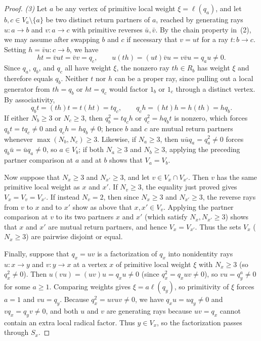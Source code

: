 \begin{proof}
\textit{(3)} Let $a$ be any vertex of primitive local weight $\xi=\ell(q_a)$, and let $b,c\in V_a\setminus\{a\}$ be two distinct return partners of $a$, reached by generating rays $u\colon a\to b$ and $v\colon a\to c$ with primitive reverses $\bar u,\bar v$. By the chain property in~(2), we may assume after swapping $b$ and $c$ if necessary that $v=ut$ for a ray $t\colon b\to c$. Setting $h=\bar v u\colon c\to b$, we have
\[
  ht=\bar v ut=\bar v v=q_c,\qquad u(th)=(ut)\bar v u=v\bar v u=q_a u\ne0.
\]
Since $q_a$, $q_b$, and $q_c$ all have weight $\xi$, the nonzero ray $th\in R_b$ has weight $\xi$ and therefore equals $q_b$. Neither $t$ nor $h$ can be a proper ray, since pulling out a local generator from $th=q_b$ or $ht=q_c$ would factor $1_b$ or $1_c$ through a distinct vertex. By associativity,
\[
  q_bt=(th)t=t(ht)=tq_c,\qquad q_ch=(ht)h=h(th)=hq_b.
\]
If either $N_b\geq3$ or $N_c\geq3$, then $q_b^2=tq_ch$ or $q_c^2=hq_bt$ is nonzero, which forces $q_bt=tq_c\ne0$ and $q_ch=hq_b\ne0$; hence $b$ and $c$ are mutual return partners whenever $\max(N_b,N_c)\geq3$. Likewise, if $N_a\geq3$, then $u\bar u q_a=q_a^2\ne0$ forces $q_b\bar u=\bar u q_a\ne0$, so $a\in V_b$; if both $N_a\geq3$ and $N_b\geq3$, applying the preceding partner comparison at $a$ and at $b$ shows that $V_a=V_b$.

Now suppose that $N_x\geq3$ and $N_{x'}\geq3$, and let $v\in V_x\cap V_{x'}$. Then $v$ has the same primitive local weight as $x$ and $x'$. If $N_v\geq3$, the equality just proved gives $V_x=V_v=V_{x'}$. If instead $N_v=2$, then since $N_x\geq3$ and $N_{x'}\geq3$, the reverse rays from $v$ to $x$ and to $x'$ show as above that $x,x'\in V_v$. Applying the partner comparison at $v$ to its two partners $x$ and $x'$ (which satisfy $N_x,N_{x'}\geq3$) shows that $x$ and $x'$ are mutual return partners, and hence $V_x=V_{x'}$. Thus the sets $V_x$ ($N_x\geq3$) are pairwise disjoint or equal.

Finally, suppose that $q_x=uv$ is a factorization of $q_x$ into nonidentity rays $u\colon x\to y$ and $v\colon y\to x$ at a vertex $x$ of primitive local weight $\xi$ with $N_x\geq3$ (so $q_x^2\ne0$). Then $u(vu)=(uv)u=q_xu\ne0$ (since $q_x^2=q_xuv\ne0$), so $vu=q_y^a\ne0$ for some $a\geq1$. Comparing weights gives $\xi=a\ell(q_y)$, so primitivity of $\xi$ forces $a=1$ and $vu=q_y$. Because $q_x^2=uvuv\ne0$, we have $q_xu=uq_y\ne0$ and $vq_x=q_yv\ne0$, and both $u$ and $v$ are generating rays because $uv=q_x$ cannot contain an extra local radical factor. Thus $y\in V_x$, so the factorization passes through $S_x$.
\end{proof}

